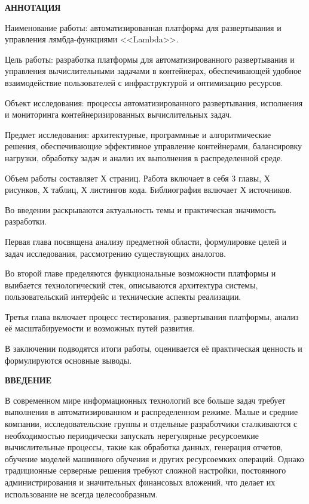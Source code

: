 \newpage
\begin{center}
  \textbf{\large АННОТАЦИЯ}
\end{center}

Наименование работы: автоматизированная платформа для развертывания и управления лямбда-функциями <<Lambda>>.

Цель работы: разработка платформы для автоматизированного развертывания и управления вычислительными задачами в контейнерах, обеспечивающей удобное взаимодействие пользователей с инфраструктурой и оптимизацию ресурсов.

Объект исследования: процессы автоматизированного развертывания, исполнения и мониторинга контейнеризированных вычислительных задач.

Предмет исследования: архитектурные, программные и алгоритмические решения, обеспечивающие эффективное управление контейнерами, балансировку нагрузки, обработку задач и анализ их выполнения в распределенной среде.

Объем работы составляет Х страниц. 
Работа включает в себя 3 главы, Х рисунков, Х таблиц, Х листингов кода.
Библиография включает Х источников.

Во введении раскрываются актуальность темы и практическая значимость разработки.

Первая глава посвящена анализу предметной области, формулировке целей и задач исследования, рассмотрению существующих аналогов.

Во второй главе пределяются функциональные возможности платформы и выибается технологический стек, описываются архитектура системы, пользовательский интерфейс и технические аспекты реализации.

Третья глава включает процесс тестирования, развертывания платформы, анализ её масштабируемости и возможных путей развития.

В заключении подводятся итоги работы, оценивается её практическая ценность и формулируются основные выводы.

\onehalfspacing
\setcounter{page}{6}

\newpage
\renewcommand{\contentsname}{\centerline{\large СОДЕРЖАНИЕ}}
\tableofcontents

\newpage
\begin{center}
  \textbf{\large ВВЕДЕНИЕ}
\end{center}

В современном мире информационных технологий все больше задач требует выполнения в автоматизированном и распределенном режиме.
Малые и средние компании, исследовательские группы и отдельные разработчики сталкиваются с необходимостью периодически запускать нерегулярные ресурсоемкие вычислительные процессы, такие как обработка данных, генерация отчетов, обучение моделей машинного обучения и других ресурсоемких операций.
Однако традиционные серверные решения требуют сложной настройки, постоянного администрирования и значительных финансовых вложений, что делает их использование не всегда целесообразным.

